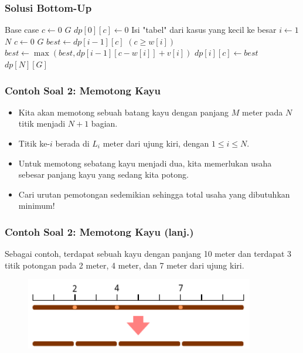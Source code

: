 \begin{frame}
\frametitle{Solusi Bottom-Up}
\begin{codebox}
\li \Comment Base case
\li \For $c \gets 0$ \To $G$ \Do
\li   $dp[0][c] \gets 0$
    \End
\zi
\li \Comment Isi "tabel" dari kasus yang kecil ke besar
\li \For $i \gets 1$ \To $N$ \Do
\li   \For $c \gets 0$ \To $G$ \Do
\li     $best \gets dp[i-1][c]$
\li     \If $(c \geq w[i])$ \Then
\li       $best \gets \max(best, dp[i - 1][c-w[i]] + v[i])$
        \End  
\li     $dp[i][c] \gets best$
      \End
    \End    
\zi    
\li \Return $dp[N][G]$
    \End
\end{codebox}
\end{frame}

\begin{frame}
\frametitle{Contoh Soal 2: Memotong Kayu }
\begin{itemize}
  \item Kita akan memotong sebuah batang kayu dengan panjang $M$ meter pada $N$ titik menjadi $N+1$ bagian.
  \item Titik ke-$i$ berada di $L_i$ meter dari ujung kiri, dengan $1 \leq i \leq N$.
  \item Untuk memotong sebatang kayu menjadi dua, kita memerlukan usaha \alert{sebesar panjang kayu yang sedang kita potong}.
  \item Cari urutan pemotongan sedemikian sehingga total usaha yang dibutuhkan minimum!
\end{itemize}
\end{frame}

\begin{frame}
\frametitle{Contoh Soal 2: Memotong Kayu (lanj.)}
Sebagai contoh, terdapat sebuah kayu dengan panjang 10 meter dan terdapat 3 titik potongan pada 2 meter, 4 meter, dan 7 meter dari ujung kiri.
\begin{figure}
  \includegraphics[width=10cm]{asset/cutting-stick-1.pdf}
\end{figure}
\end{frame}

